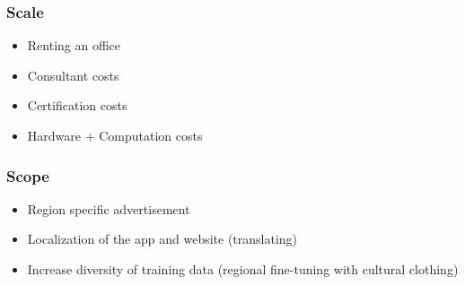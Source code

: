 \subsubsection*{Scale}
\begin{itemize}
    \item Renting an office
    \item Consultant costs
    \item Certification costs
    \item Hardware + Computation costs
\end{itemize}

\subsubsection*{Scope}
\begin{itemize}
    \item Region specific advertisement
    \item Localization of the app and website (translating)
    \item Increase diversity of training data (regional fine-tuning with cultural clothing)
\end{itemize}

